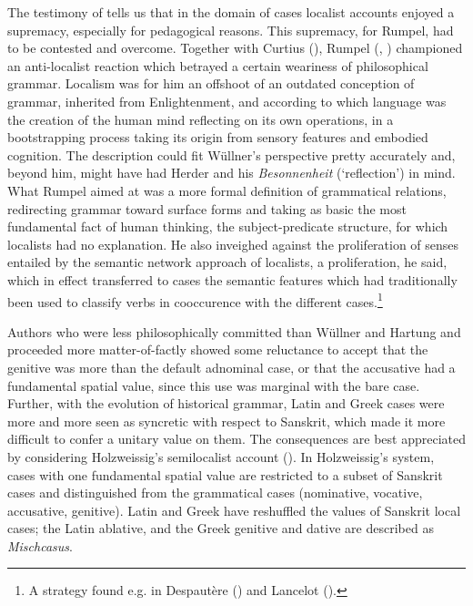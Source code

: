 \documentclass[output=paper]{langscibook}
\begin{document}
The testimony of \citet{rumpel_casuslehre_1845} tells us that in the domain of cases localist accounts enjoyed a supremacy, especially for pedagogical reasons. This supremacy, for Rumpel, had to be contested and overcome. Together with Curtius (\citealt{curtius_uber_1864}), Rumpel (\citealt{rumpel_casuslehre_1845}, \citeyear{rumpel_zur_1866}) championed an anti-localist reaction which betrayed a certain weariness of philosophical grammar. Localism was for him an offshoot of an outdated conception of grammar, inherited from Enlightenment, and according to which language was the creation of the human mind reflecting on its own operations, in a bootstrapping process taking its origin from sensory features and embodied cognition. The description could fit Wüllner’s perspective pretty accurately and, beyond him, might have had Herder and his \textit{Besonnenheit} (‘reflection’) in mind. What Rumpel aimed at was a more formal definition of grammatical relations, redirecting grammar toward surface forms and taking as basic the most fundamental fact of human thinking, the subject-predicate structure, for which localists had no explanation. He also inveighed against the proliferation of senses entailed by the semantic network approach of localists, a proliferation, he said, which in effect transferred to cases the semantic features which had traditionally been used to classify verbs in cooccurence with the different cases.\footnote{\textrm{ A strategy found e.g. in Despautère (\citealt{despautere_sintaxis_1527}) and Lancelot (\citealt{lancelot_nouvelle_1653}). }}

Authors who were less philosophically committed than Wüllner and Hartung and proceeded more matter-of-factly showed some reluctance to accept that the genitive was more than the default adnominal case, or that the accusative had a fundamental spatial value, since this use was marginal with the bare case. Further, with the evolution of historical grammar, Latin and Greek cases were more and more seen as syncretic with respect to Sanskrit, which made it more difficult to confer a unitary value on them. The consequences are best appreciated by considering Holzweissig’s semilocalist account (\citealt{holzweissig_wahrheit_1877}). In Holzweissig’s system, cases with one fundamental spatial value are restricted to a subset of Sanskrit cases and distinguished from the grammatical cases (nominative, vocative, accusative, genitive). Latin and Greek have reshuffled the values of Sanskrit local cases; the Latin ablative, and the Greek genitive and dative are described as \textit{Mischcasus}.
\end{document}
